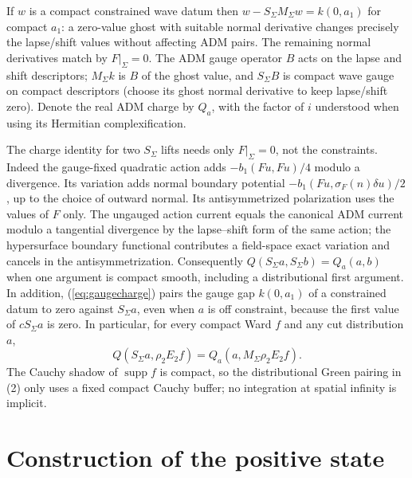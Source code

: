 \documentclass[11pt]{article}
\newcommand{\supp}{\operatorname{supp}}
\begin{document}
If $w$ is a compact constrained wave datum then
$w-S_\Sigma M_\Sigma w=k(0,a_1)$ for compact $a_1$: a zero-value
ghost with suitable normal derivative changes precisely the
lapse/shift values without affecting ADM pairs. The remaining normal
derivatives match by $F|_\Sigma=0$. The ADM gauge operator $B$ acts
on the lapse and shift descriptors; $M_\Sigma k$ is $B$ of the
ghost value, and $S_\Sigma B$ is compact wave gauge on compact
descriptors (choose its ghost normal derivative to keep lapse/shift
zero). Denote the real ADM charge by $Q_a$, with the factor of $i$
understood when using its Hermitian complexification.

The charge identity for two $S_\Sigma$ lifts needs only
$F|_\Sigma=0$, not the constraints. Indeed the gauge-fixed quadratic
action adds $-b_1(Fu,Fu)/4$ modulo a divergence. Its variation adds
normal boundary potential $-b_1(Fu,\sigma_F(n)\delta u)/2$, up to
the choice of outward normal. Its antisymmetrized polarization uses
the values of $F$ only. The ungauged action current equals the
canonical ADM current modulo a tangential divergence by the lapse--shift
form of the same action; the hypersurface boundary functional contributes
a field-space exact variation and cancels in the antisymmetrization.
Consequently $Q(S_\Sigma a,S_\Sigma b)=Q_a(a,b)$ when one argument
is compact smooth, including a distributional first argument. In
addition, (\ref{eq:gaugecharge}) pairs the gauge gap $k(0,a_1)$
of a constrained datum to zero against $S_\Sigma a$, even when $a$
is off constraint, because the first value of $cS_\Sigma a$ is
zero. In particular, for every compact Ward $f$ and any cut
distribution $a$,
\begin{equation}
 Q(S_\Sigma a,\rho_2E_2 f)=Q_a(a,M_\Sigma\rho_2E_2 f).       \label{eq:offcharge}
\end{equation}
The Cauchy shadow of $\supp f$ is compact, so the distributional Green
pairing in (2) only uses a fixed compact Cauchy buffer; no integration
at spatial infinity is implicit.

\section{Construction of the positive state}\label{sec:construction}
\end{document}
